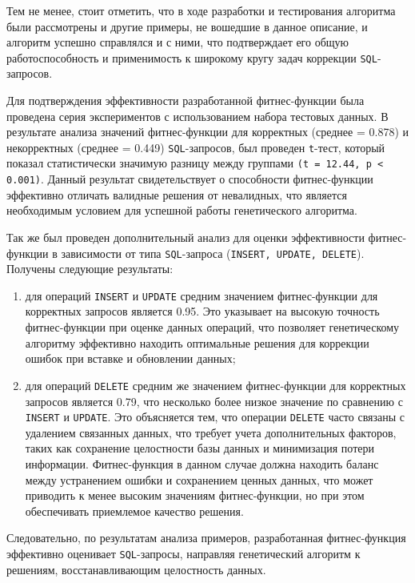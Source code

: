 \documentclass[master,paper]{pmk-graduate}
\begin{document}
Тем не менее, стоит отметить, что в ходе разработки и тестирования алгоритма были рассмотрены и другие примеры, не вошедшие в данное описание, и алгоритм успешно справлялся и с ними, что подтверждает его общую работоспособность и применимость к широкому кругу задач коррекции \texttt{SQL}-запросов.

Для подтверждения эффективности разработанной фитнес-функции была проведена серия экспериментов с использованием набора тестовых данных. В результате анализа значений фитнес-функции для корректных (среднее = 0.878) и некорректных (среднее = 0.449) \texttt{SQL}-запросов, был проведен \texttt{t}-тест, который показал статистически значимую разницу между группами \texttt{(t = 12.44, p < 0.001)}. Данный результат свидетельствует о способности фитнес-функции эффективно отличать валидные решения от невалидных, что является необходимым условием для успешной работы генетического алгоритма.

Так же был проведен дополнительный анализ для оценки эффективнос\-ти фитнес-функции в зависимости от типа \texttt{SQL}-запроса (\texttt{INSERT, UPDATE, DELETE}). Получены следующие результаты:
\begin{enumerate}
\item для операций \texttt{INSERT} и \texttt{UPDATE} средним значением фитнес-функции для корректных запросов является 0.95. Это указывает на высокую точность фитнес-функции при оценке данных операций, что позволяет генетическому алгоритму эффективно находить оптимальные решения для коррекции ошибок при вставке и обновлении данных;
	
\item для операций \texttt{DELETE} средним же значением фитнес-функции для корректных запросов является 0.79, что несколько более низкое значение по сравнению с \texttt{INSERT} и \texttt{UPDATE}. Это объясняется тем, что операции \texttt{DELETE} часто связаны с удалением связанных данных, что требует учета дополнительных факторов, таких как сохранение целостности базы данных и минимизация потери информации. Фитнес-функция в данном случае должна находить баланс между устранением ошибки и сохранением ценных данных, что может приводить к менее высоким значениям фитнес-функции, но при этом обеспечивать приемлемое качество решения.
\end{enumerate}

Следовательно, по результатам анализа примеров, разработанная фитнес-функция эффективно оценивает \texttt{SQL}-запросы, направляя генетический алгоритм к решениям, восстанавливающим целостность данных. 
\end{document}
